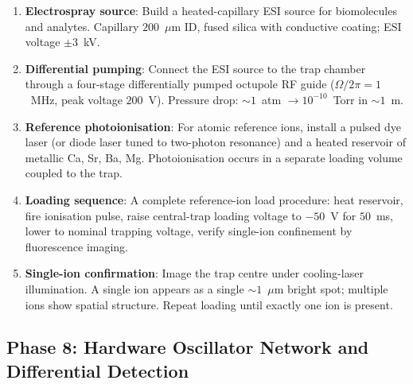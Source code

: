 \begin{enumerate}[leftmargin=1.5em]
    \item \textbf{Electrospray source}: Build a heated-capillary ESI source for biomolecules and analytes. Capillary $200$~$\mu$m ID, fused silica with conductive coating; ESI voltage $\pm 3$~kV.
    \item \textbf{Differential pumping}: Connect the ESI source to the trap chamber through a four-stage differentially pumped octupole RF guide ($\Omega/2\pi = 1$~MHz, peak voltage $200$~V). Pressure drop: $\sim 1$~atm $\to 10^{-10}$~Torr in $\sim 1$~m.
    \item \textbf{Reference photoionisation}: For atomic reference ions, install a pulsed dye laser (or diode laser tuned to two-photon resonance) and a heated reservoir of metallic Ca, Sr, Ba, Mg. Photoionisation occurs in a separate loading volume coupled to the trap.
    \item \textbf{Loading sequence}: A complete reference-ion load procedure: heat reservoir, fire ionisation pulse, raise central-trap loading voltage to $-50$~V for $50$~ms, lower to nominal trapping voltage, verify single-ion confinement by fluorescence imaging.
    \item \textbf{Single-ion confirmation}: Image the trap centre under cooling-laser illumination. A single ion appears as a single $\sim 1$~$\mu$m bright spot; multiple ions show spatial structure. Repeat loading until exactly one ion is present.
\end{enumerate}

\subsection{Phase 8: Hardware Oscillator Network and Differential Detection}
\label{subsec:phase8_electronics}


